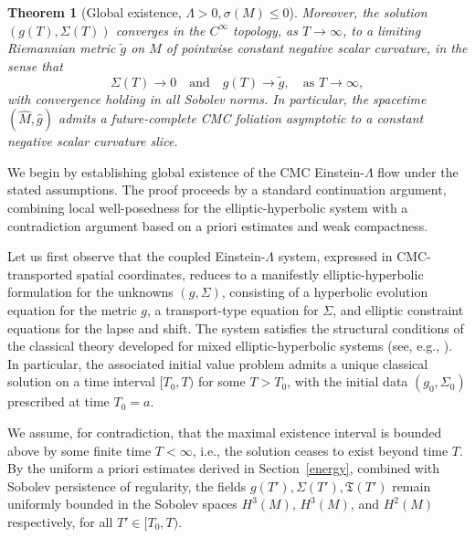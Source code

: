 \documentclass{amsart}
\newtheorem*{theorem-non}{Theorem}
\begin{document}
\begin{theorem-non} [Global existence, $\Lambda>0, \sigma(M)\leq 0$]
\noindent Moreover, the solution $(g(T), \Sigma(T))$ converges in the $C^\infty$ topology, as $T \to \infty$, to a limiting Riemannian metric $\widetilde{g}$ on $M$ of pointwise constant negative scalar curvature, in the sense that
\[
\Sigma(T) \to 0 \quad \text{and} \quad g(T) \to \widetilde{g}, \quad \text{as } T \to \infty,
\]
with convergence holding in all Sobolev norms. In particular, the spacetime $(\widehat{M}, \widehat{g})$ admits a future-complete CMC foliation asymptotic to a constant negative scalar curvature slice.  
\end{theorem-non}

\noindent We begin by establishing global existence of the CMC Einstein-$\Lambda$ flow under the stated assumptions. The proof proceeds by a standard continuation argument, combining local well-posedness for the elliptic-hyperbolic system with a contradiction argument based on a priori estimates and weak compactness.

\noindent Let us first observe that the coupled Einstein-$\Lambda$ system, expressed in CMC-transported spatial coordinates, reduces to a manifestly elliptic-hyperbolic formulation for the unknowns $(g, \Sigma)$, consisting of a hyperbolic evolution equation for the metric $g$, a transport-type equation for $\Sigma$, and elliptic constraint equations for the lapse and shift. The system satisfies the structural conditions of the classical theory developed for mixed elliptic-hyperbolic systems (see, e.g., \cite{elliptichyperbolic}). In particular, the associated initial value problem admits a unique classical solution on a time interval $[T_0, T)$ for some $T > T_0$, with the initial data $(g_0, \Sigma_0)$ prescribed at time $T_0 = a$.

\noindent We assume, for contradiction, that the maximal existence interval is bounded above by some finite time $T < \infty$, i.e., the solution ceases to exist beyond time $T$. By the uniform a priori estimates derived in Section~\ref{energy}, combined with Sobolev persistence of regularity, the fields $g(T'), \Sigma(T'), \mathfrak{T}(T')$ remain uniformly bounded in the Sobolev spaces $H^3(M)$, $H^3(M)$, and $H^2(M)$ respectively, for all $T' \in [T_0, T)$.
\end{document}

